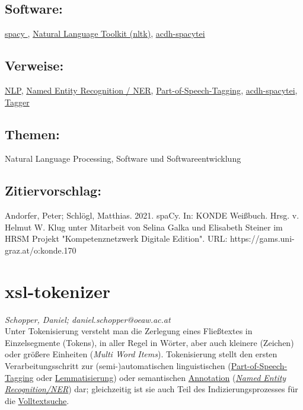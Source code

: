 \documentclass{article}
\begin{document}
        \subsection*{Software:}\href{https://spacy.io/}{spacy }, \href{https://www.nltk.org/}{Natural Language Toolkit (nltk)}, \href{https://github.com/acdh-oeaw/acdh-spacytei}{acdh-spacytei}\subsection*{Verweise:}\href{https://gams.uni-graz.at/o:konde.145}{NLP}, \href{https://gams.uni-graz.at/o:konde.141}{Named Entity Recognition / NER}, \href{https://gams.uni-graz.at/o:konde.156}{Part-of-Speech-Tagging}, \href{https://gams.uni-graz.at/o:konde.2}{acdh-spacytei}, \href{https://gams.uni-graz.at/o:konde.176}{Tagger}\subsection*{Themen:}Natural Language Processing, Software und Softwareentwicklung\subsection*{Zitiervorschlag:}Andorfer, Peter; Schlögl, Matthias. 2021. spaCy. In: KONDE Weißbuch. Hrsg. v. Helmut W. Klug unter Mitarbeit von Selina Galka und Elisabeth Steiner im HRSM Projekt "Kompetenznetzwerk Digitale Edition". URL: https://gams.uni-graz.at/o:konde.170\newpage\section*{xsl-tokenizer} \emph{Schopper, Daniel; daniel.schopper@oeaw.ac.at }\\
        
    Unter Tokenisierung versteht man die Zerlegung eines Fließtextes in Einzelsegmente
                  (Tokens), in aller Regel in Wörter, aber auch kleinere (Zeichen) oder größere
                  Einheiten (\emph{Multi Word Items}). Tokenisierung stellt den
                  ersten Verarbeitungsschritt zur (semi-)automatischen linguistischen (\href{http://gams.uni-graz.at/o:konde.156}{Part-of-Speech-Tagging} oder \href{http://gams.uni-graz.at/o:konde.115}{Lemmatisierung}) oder semantischen
                     \href{http://gams.uni-graz.at/o:konde.17}{Annotation} (\emph{\href{http://gams.uni-graz.at/o:konde.151}{Named Entity Recognition/NER}}) dar; gleichzeitig ist sie auch Teil des Indizierungsprozesses für die \href{http://gams.uni-graz.at/o:konde.211}{Volltextsuche}.\\
            
\end{document}
